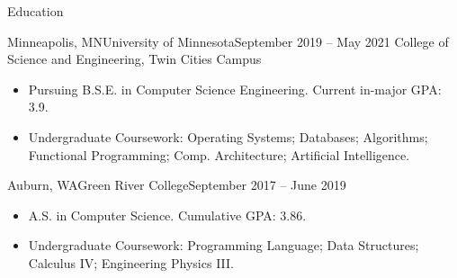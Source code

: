 \documentclass[]{mcdowellcv}
\begin{document}
	\makeheader
	\begin{cvsection}{Education}
		\begin{cvsubsection}{Minneapolis, MN}{University of Minnesota}{September 2019 -- May 2021}
		    College of Science and Engineering, Twin Cities Campus
			\begin{itemize}
				\item Pursuing B.S.E. in Computer Science Engineering. Current in-major GPA: 3.9.
				\item Undergraduate Coursework: Operating Systems; Databases; Algorithms; Functional Programming; Comp. Architecture; Artificial Intelligence.
			\end{itemize}
		\end{cvsubsection}
		
		\begin{cvsubsection}{Auburn, WA}{Green River College}{September 2017 -- June 2019} 
		    \begin{itemize}
		        \item A.S. in Computer Science. Cumulative GPA: 3.86.
		        \item Undergraduate Coursework: Programming Language; Data Structures; Calculus IV; Engineering Physics III.
		    \end{itemize}
		\end{cvsubsection}
	\end{cvsection}
	
\end{document}
